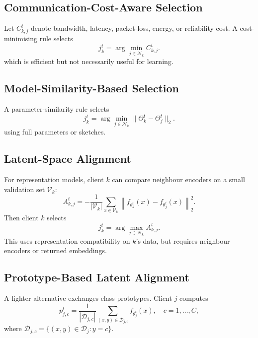 \documentclass[conference]{IEEEtran}
\begin{document}
\subsection{Communication-Cost-Aware Selection}
\label{subsec:communication-cost-aware-selection}
Let \(C_{k,j}^t\) denote bandwidth, latency, packet-loss, energy, or reliability cost. A cost-minimising rule selects
\begin{equation*}
    j_k^t = \arg\min_{j\in\mathcal{N}_k} C_{k,j}^t.
\end{equation*}
which is efficient but not necessarily useful for learning.

\subsection{Model-Similarity-Based Selection}
\label{subsec:model-similarity-based-selection}
A parameter-similarity rule selects
\begin{equation*}
    j_k^t
    =
    \arg\min_{j\in\mathcal{N}_k}
    \|\Theta_k^t-\Theta_j^t\|_2.
\end{equation*}
using full parameters or sketches.

\subsection{Latent-Space Alignment}
\label{subsec:latent-space-alignment}
For representation models, client \(k\) can compare neighbour encoders on a small validation set \(\mathcal{V}_k\):
\begin{equation*}
    A_{k,j}^{t}
    =
    -\frac{1}{|\mathcal{V}_k|}
    \sum_{x\in\mathcal{V}_k}
    \left\|
    f_{\theta_k^t}(x)-f_{\theta_j^t}(x)
    \right\|_2^2.
\end{equation*}
Then client \(k\) selects
\begin{equation*}
    j_k^t = \arg\max_{j\in\mathcal{N}_k} A_{k,j}^{t}.
\end{equation*}
This uses representation compatibility on \(k\)'s data, but requires neighbour encoders or returned embeddings.

\subsection{Prototype-Based Latent Alignment}
\label{subsec:prototype-based-latent-alignment}
A lighter alternative exchanges class prototypes. Client \(j\) computes
\begin{equation*}
    p_{j,c}^{t}
    =
    \frac{1}{|\mathcal{D}_{j,c}|}
    \sum_{(x,y)\in\mathcal{D}_{j,c}}
    f_{\theta_j^t}(x),
    \quad c=1,\dots,C,
\end{equation*}
where \(\mathcal{D}_{j,c}=\{(x,y)\in\mathcal{D}_j:y=c\}\).
\end{document}
